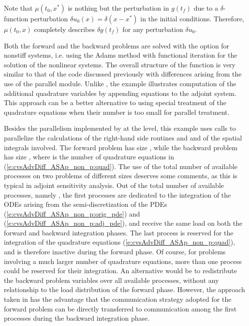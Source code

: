 Note that $\mu(t_0 , x^*)$ is nothing but the perturbation in $g(t_f)$
due to a $\delta$-function perturbation $\delta u_0(x) = \delta(x-x^*)$ in the
initial conditions.  Therefore, $\mu(t_0,x)$ completely describes $\delta g(t_f)$
for any perturbation $\delta u_0$.

Both the forward and the backward problems are solved with the option for nonstiff systems,
i.e. using the Adams method with functional iteration for the solution of
the nonlinear systems. The overall structure of the  function is very
similar to that of the code  discussed previously with 
differences arising from the use of the parallel {\nvector} module. Unlike 
, the example  illustrates
computation of the additional quadrature variables by appending  equations
to the adjoint system.  This approach can be a better alternative to using special
treatment of the quadrature equations when their number is too small for parallel
treatment.

Besides the parallelism implemented by {\cvodes} at the {\nvector} level,
this example uses {\mpi} calls to parallelize the calculations of the
right-hand side routines  and  and of the spatial integrals involved.
The forward problem has size , while the backward problem has
size , where  is the number of quadrature equations
in (\ref{e:cvsAdvDiff_ASAp_non_p:quad}).
The use of the total number of available processes on two problems of different 
sizes deserves some comments, as this is typical in adjoint sensitivity 
analysis. Out of the total number of available processes, namely ,
the first  processes are dedicated to the integration of
the ODEs arising from the semi-discretization of the PDEs 
(\ref{e:cvsAdvDiff_ASAp_non_p:orig_pde}) and (\ref{e:cvsAdvDiff_ASAp_non_p:adj_pde}),
and receive the same load on both the forward and backward integration phases. 
The last process is reserved for the integration of the quadrature equations 
(\ref{e:cvsAdvDiff_ASAp_non_p:quad}), and is therefore inactive during the forward 
phase. Of course, for problems involving a much larger number of quadrature equations,
more than one process could be reserved for their integration. 
An alternative would be to redistribute the  backward problem variables 
over all available processes, without any relationship to the load distribution 
of the forward phase. However, the approach taken in 
has the advantage that the communication strategy adopted for the forward problem 
can be directly transferred to communication among the first 
processes during the backward integration phase. 

